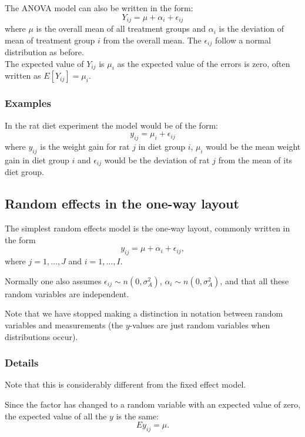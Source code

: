 \documentclass[12pt,a4paper]{article}
\theoremstyle{regla}
\theoremstyle{remark}
\theoremstyle{definition}
\theoremstyle{nonumberbreak}
\begin{document}
The ANOVA model can also be written in the form:
$$Y_{ij}=\mu+\alpha_i+\epsilon_{ij}$$
where $\mu$ is the overall mean of all treatment groups and $\alpha_i$ is the deviation of mean of treatment group $i$ from the overall mean. The $\epsilon_{ij}$ follow a normal distribution as before.\\

The expected value of $Y_{ij}$ is $\mu_i$ as the expected value of the errors is zero, often written as $E[Y_{ij}]=\mu_i$.
\subsubsection{Examples}
\begin{xmpl}
In the rat diet experiment the model would be of the form:
$$y_{ij}=\mu_i+\epsilon_{ij}$$
where $y_{ij}$ is the weight gain for rat $j$ in diet group $i$, $\mu_i$ would be the mean weight gain in diet group $i$ and $\epsilon_{ij}$ would be the deviation of rat $j$ from the mean of its diet group.
\end{xmpl}

\subsection{Random effects in the one-way layout}
\begin{fbox}
\begin{minipage}{0.97\textwidth}
The simplest random effects model is the one-way layout, commonly written in the form
$$y_{ij}=\mu + \alpha_i + \epsilon_{ij},$$
where $j =1,\ldots,J$ and $i =1,\ldots,I$.

Normally one also assumes $\epsilon_{ij}\sim n (0,\sigma_A^2)$, $\alpha_i \sim n (0,\sigma_A^2)$, and that all these random variables are independent.

Note that we have stopped making a distinction in notation between random variables and measurements (the $y$-values are just random variables when distributions occur).

\end{minipage}
\end{fbox}
\subsubsection{Details}
Note that this is considerably different from the fixed effect model.

Since the factor has changed to a random variable with an expected value of zero, the expected value of all the $y$ is the same:
$$Ey_{ij}=\mu .$$
\end{document}
